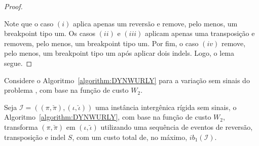 \begin{proof}
\begin{enumerate}[i.]
\end{enumerate}
Note que o caso $(i)$ aplica apenas um reversão e remove, pelo menos, um breakpoint tipo um. Os casos $(ii)$ e $(iii)$ aplicam apenas uma transposição e removem, pelo menos, um breakpoint tipo um. Por fim, o caso $(iv)$ remove, pelo menos, um breakpoint tipo um após aplicar dois indels. Logo, o lema segue.
\end{proof}

Considere o Algoritmo~\ref{algorithm:DYNWURLY} para a variação sem sinais do problema \SbWIRTI{}, com base na função de custo $W_2$.



\begin{lemma}\label{lemma:IKTEYDRR}
Seja $\mathcal{I} = ((\pi,\breve\pi),(\iota,\breve\iota))$ uma instância intergênica rígida sem sinais, o Algoritmo~\ref{algorithm:DYNWURLY}, com base na função de custo $W_2$, transforma $(\pi,\breve\pi)$ em $(\iota,\breve\iota)$ utilizando uma sequência de eventos de reversão, transposição e indel $S$, com um custo total de, no máximo, $ib_1(\mathcal{I})$.
\end{lemma}
